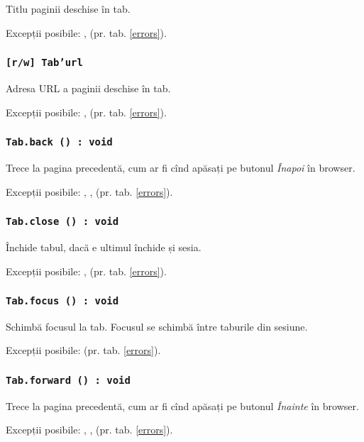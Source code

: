 Titlu paginii deschise în tab.

Excepții posibile: ,  (pr. tab. \ref{errors}).

\subsubsection{\texttt{[r/w] Tab'url}}

Adresa URL a paginii deschise în tab.

Excepții posibile: ,  (pr. tab. \ref{errors}).

\subsubsection{\texttt{Tab.back () : void}}

Trece la pagina precedentă, cum ar fi cînd apăsați pe butonul \textit{Înapoi} în browser.

Excepții posibile: , ,  (pr. tab. \ref{errors}).

\subsubsection{\texttt{Tab.close () : void}}

Închide tabul, dacă e ultimul închide și sesia.

Excepții posibile: ,  (pr. tab. \ref{errors}).

\subsubsection{\texttt{Tab.focus () : void}}

Schimbă focusul la tab. Focusul se schimbă între taburile din sesiune.

Excepții posibile:  (pr. tab. \ref{errors}).

\subsubsection{\texttt{Tab.forward () : void}}

Trece la pagina precedentă, cum ar fi cînd apăsați pe butonul \textit{Înainte} în browser.


Excepții posibile: , ,  (pr. tab. \ref{errors}).

